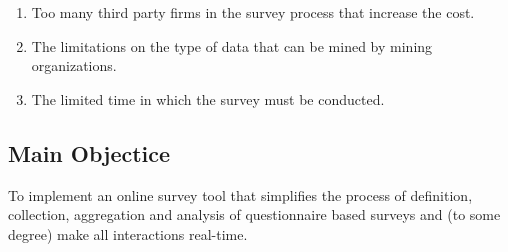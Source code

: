 \documentclass[a4paper,12pt]{article}
\begin{document}
\begin{enumerate}[label=(\roman*)]
\item Too many third party firms in the survey process that increase the cost.
\item The  limitations on the type of data that can be mined by  mining organizations.
\item The limited time in which the survey must be conducted.
\end{enumerate}


\subsection{Main Objectice}
To implement an online survey tool that simplifies the process of definition, collection, aggregation and analysis of questionnaire based surveys and (to some degree) make all interactions real-time.
\end{document}
